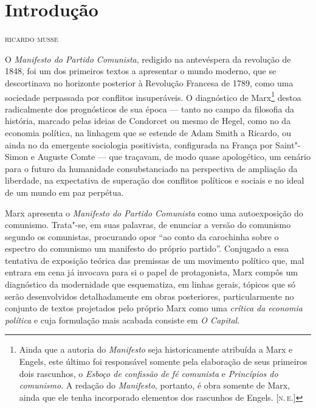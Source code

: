 \pagestyle{plain}

\chapter*{Introdução\smallskip{}}

\begin{flushright}
\textsc{ricardo musse}
\end{flushright}

\noindent{}O \textit{Manifesto do Partido Comunista}, redigido na antevéspera da
revolução de 1848, foi um dos primeiros textos a apresentar o mundo
moderno, que se descortinava no horizonte posterior à Revolução
Francesa de 1789, como uma sociedade perpassada por conflitos
insuperáveis. O diagnóstico de Marx\footnote{Ainda que a autoria do \textit{Manifesto} 
seja historicamente atribuída a Marx e Engels, este último foi responsável somente pela 
elaboração de seus primeiros dois rascunhos, o \textit{Esboço de confissão de fé comunista} e \textit{Princípios do comunismo}. 
A redação do \textit{Manifesto}, portanto, é obra somente de Marx, ainda que ele tenha incorporado 
elementos dos rascunhos de Engels. [\textsc{n.\,e.}]} destoa radicalmente dos
prognósticos de sua época --- tanto no campo da filosofia da história,
marcado pelas ideias de Condorcet ou mesmo de Hegel, como no da
economia política, na linhagem que se estende de Adam Smith a Ricardo,
ou ainda no da emergente sociologia positivista, configurada na França
por Saint"-Simon e Auguste Comte --- que traçavam, de modo quase
apologético, um cenário para o futuro da humanidade consubstanciado na
perspectiva de ampliação da liberdade, na expectativa de superação dos
conflitos políticos e sociais e no ideal de um mundo em paz perpétua.

Marx apresenta o \textit{Manifesto do Partido Comunista} como uma
autoexposição do comunismo. Trata"-se, em suas palavras, de
enunciar a versão do comunismo segundo os comunistas, procurando opor
``ao conto da carochinha sobre o espectro do comunismo um manifesto do próprio partido''.
Conjugado a essa tentativa de exposição teórica das premissas de um
movimento político que, mal entrara em cena já invocava para si o papel
de protagonista, Marx compôs um diagnóstico da modernidade que
esquematiza, em linhas gerais, tópicos que só serão desenvolvidos
detalhadamente em obras posteriores, particularmente no conjunto de
textos projetados pelo próprio Marx como uma \textit{crítica da economia
política} e cuja formulação mais acabada consiste em \textit{O
Capital}.

